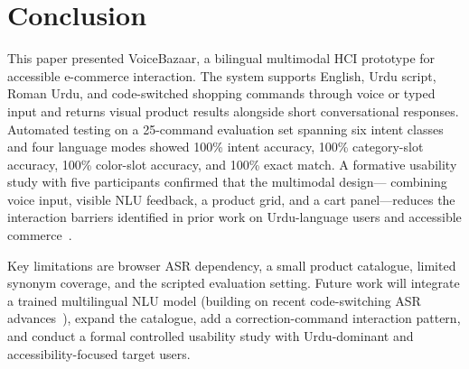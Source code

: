 \documentclass[conference]{IEEEtran}
\begin{document}
\section{Conclusion}

This paper presented VoiceBazaar, a bilingual multimodal HCI prototype
for accessible e-commerce interaction. The system supports English,
Urdu script, Roman Urdu, and code-switched shopping commands through
voice or typed input and returns visual product results alongside
short conversational responses. Automated testing on a 25-command
evaluation set spanning six intent classes and four language modes
showed 100\% intent accuracy, 100\% category-slot accuracy,
100\% color-slot accuracy, and 100\% exact match. A formative usability
study with five participants confirmed that the multimodal design---
combining voice input, visible NLU feedback, a product grid, and a
cart panel---reduces the interaction barriers identified in prior work
on Urdu-language users and accessible commerce~\cite{masina2020accessibility,
doke2024emergent,fiaz2025urdullama,sharif2024urdu}.

Key limitations are browser ASR dependency, a small product catalogue,
limited synonym coverage, and the scripted evaluation setting. Future
work will integrate a trained multilingual NLU model (building on
recent code-switching ASR advances~\cite{dhawan2023codeswitching}),
expand the catalogue, add a correction-command interaction pattern,
and conduct a formal controlled usability study with Urdu-dominant and
accessibility-focused target users.



\end{document}
